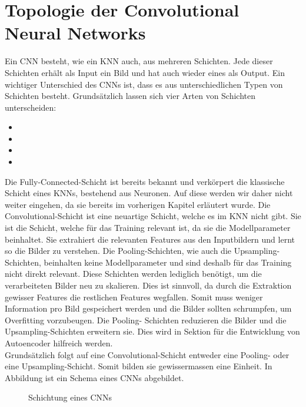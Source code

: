 \section{Topologie der Convolutional Neural Networks}
Ein CNN besteht, wie ein KNN auch, aus mehreren Schichten. Jede dieser Schichten erhält
als Input ein Bild und hat auch wieder eines als Output.
Ein wichtiger Unterschied des CNNs ist, dass es aus unterschiedlichen Typen von
Schichten besteht. Grundsätzlich lassen sich vier Arten von Schichten unterscheiden:
\begin{itemize}
\item{}
\item{}
\item{}
\item{}
\end{itemize}
Die Fully-Connected-Schicht ist bereits bekannt und verkörpert die klassische Schicht
eines KNNs, bestehend aus Neuronen. Auf diese werden wir daher nicht weiter eingehen,
da sie bereits im vorherigen Kapitel erläutert wurde.
\para{}
Die Convolutional-Schicht ist eine neuartige Schicht, welche es im KNN nicht
gibt. Sie ist die Schicht, welche für das Training relevant ist,
da sie die Modellparameter beinhaltet. Sie extrahiert die relevanten Features
aus den Inputbildern und lernt so die Bilder zu verstehen.
\para{}
Die Pooling-Schichten, wie auch die Upsampling-Schichten, beinhalten keine
Modellparameter und sind deshalb für das Training nicht direkt relevant.
Diese Schichten werden lediglich benötigt, um die verarbeiteten Bilder neu zu
skalieren. Dies ist sinnvoll, da durch die Extraktion gewisser Features die
restlichen Features wegfallen. Somit muss weniger Information pro Bild gespeichert
werden und die Bilder sollten schrumpfen, um Overfitting vorzubeugen. Die Pooling-
Schichten reduzieren die Bilder und die Upsampling-Schichten erweitern sie.
Dies wird in Sektion  für die Entwicklung von Autoencoder
hilfreich werden. \\
Grundsätzlich folgt auf eine Convolutional-Schicht entweder eine Pooling-
oder eine Upsampling-Schicht. Somit bilden sie gewissermassen eine Einheit.
\para{}
In Abbildung  ist ein Schema eines CNNs abgebildet.
\begin{figure}[h!]

  \caption{Schichtung eines CNNs}
  \label{fig:cnn_topology}
\end{figure}

